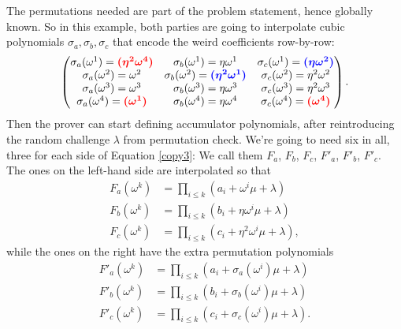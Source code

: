 The permutations needed are part of the problem statement, hence
globally known. So in this example, both parties are going to
interpolate cubic polynomials $\sigma_{a},\sigma_{b},\sigma_{c}$ that
encode the weird coefficients row-by-row:
\[
\begin{pmatrix}
\sigma_{a}( \omega^{1} ) = \textcolor{red}{\boldsymbol{({\eta^{2}\omega^{4}})}} & \sigma_{b}( \omega^{1} ) = \eta\omega^{1} & \sigma_{c}( \omega^{1} ) = \textcolor{blue}{\boldsymbol{({\eta\omega^{2}})}} \\
\sigma_{a}( \omega^{2} ) = \omega^{2} & \sigma_{b}( \omega^{2} ) = \textcolor{blue}{\boldsymbol{({\eta^{2}\omega^{1}})}} & \sigma_{c}( \omega^{2} ) = \eta^{2}\omega^{2} \\
\sigma_{a}( \omega^{3} ) = \omega^{3} & \sigma_{b}( \omega^{3} ) = \eta\omega^{3} & \sigma_{c}( \omega^{3} ) = \eta^{2}\omega^{3} \\
\sigma_{a}( \omega^{4} ) = \textcolor{red}{\boldsymbol{(\omega^{1})}} & \sigma_{b}( \omega^{4} ) = \eta\omega^{4} & \sigma_{c}( \omega^{4} ) = \textcolor{red}{\boldsymbol{(\omega^{4})}}
\end{pmatrix}.
\]
Then the prover can start defining accumulator
polynomials, after reintroducing the random challenge $\lambda$ from
permutation check. We're going to need six in all, three for each side
of Equation \eqref{copy3}: We call them $F_{a}$, $F_{b}$,
$F_{c}$, $F'_{a}$, $F'_{b}$, $F'_{c}$. The ones on the left-hand
side are interpolated so that
\begin{equation}
\label{copycheck-left}
\begin{aligned}
F_{a}( \omega^{k} ) & = \prod_{i \leq k}( a_{i} + \omega^{i}\mu + \lambda ) \\
F_{b}( \omega^{k} ) & = \prod_{i \leq k}( b_{i} + \eta\omega^{i}\mu + \lambda ) \\
F_{c}( \omega^{k} ) & = \prod_{i \leq k}( c_{i} + \eta^{2}\omega^{i}\mu + \lambda ),
\end{aligned}
\end{equation}
while the ones on the right have the extra permutation polynomials
\begin{equation}
\label{copycheck-right}
\begin{aligned}
F'_{a}( \omega^{k} ) & = \prod_{i \leq k}( a_{i} + \sigma_{a}( \omega^{i} )\mu + \lambda ) \\
F'_{b}( \omega^{k} ) & = \prod_{i \leq k}( b_{i} + \sigma_{b}( \omega^{i} )\mu + \lambda ) \\
F'_{c}( \omega^{k} ) & = \prod_{i \leq k}( c_{i} + \sigma_{c}( \omega^{i} )\mu + \lambda ).
\end{aligned}
\end{equation}

